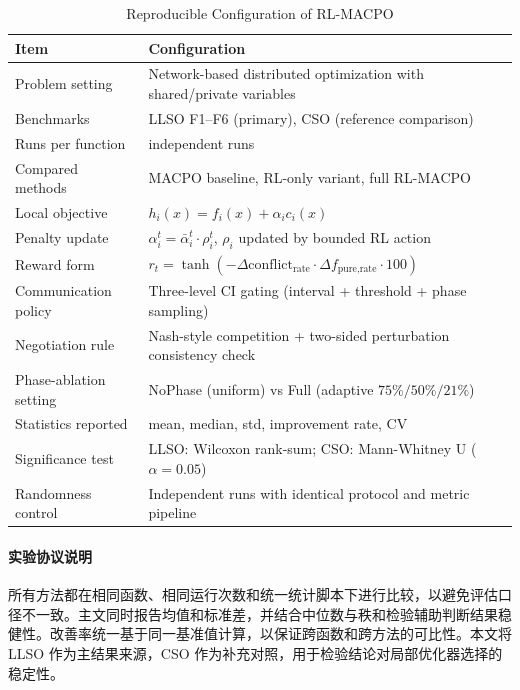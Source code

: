 \documentclass[conference]{IEEEtran}
\begin{document}
\begin{table}[htbp]
  \centering
  \caption{Reproducible Configuration of RL-MACPO}
  \label{tab:repro_config}
  \begin{tabularx}{\textwidth}{>{\raggedright\arraybackslash}p{} >{\raggedright\arraybackslash}X}
  \toprule
  \textbf{Item} & \textbf{Configuration} \\
  \midrule
  Problem setting & Network-based distributed optimization with shared/private variables \\
  Benchmarks & LLSO F1--F6 (primary), CSO (reference comparison) \\
  Runs per function & 25 independent runs \\
  Compared methods & MACPO baseline, RL-only variant, full RL-MACPO \\
  Local objective & $h_i(x)=f_i(x)+\alpha_i c_i(x)$ \\
  Penalty update & $\alpha_i^t=\bar{\alpha}_i^t\cdot \rho_i^t$, $\rho_i$ updated by bounded RL action \\
  Reward form & $r_t=\tanh\!\left(-\Delta\text{conflict}_{\text{rate}}\cdot \Delta f_{\text{pure,rate}}\cdot 100\right)$ \\
  Communication policy & Three-level CI gating (interval + threshold + phase sampling) \\
  Negotiation rule & Nash-style competition + two-sided perturbation consistency check \\
  Phase-ablation setting & NoPhase (uniform) vs Full (adaptive $75\%/50\%/21\%$) \\
  Statistics reported & mean, median, std, improvement rate, CV \\
  Significance test & LLSO: Wilcoxon rank-sum; CSO: Mann-Whitney U ($\alpha=0.05$) \\
  Randomness control & Independent runs with identical protocol and metric pipeline \\
  \bottomrule
  \end{tabularx}
\end{table}

\paragraph{实验协议说明}
所有方法都在相同函数、相同运行次数和统一统计脚本下进行比较，以避免评估口径不一致。主文同时报告均值和标准差，并结合中位数与秩和检验辅助判断结果稳健性。改善率统一基于同一基准值计算，以保证跨函数和跨方法的可比性。本文将 LLSO 作为主结果来源，CSO 作为补充对照，用于检验结论对局部优化器选择的稳定性。
\end{document}
